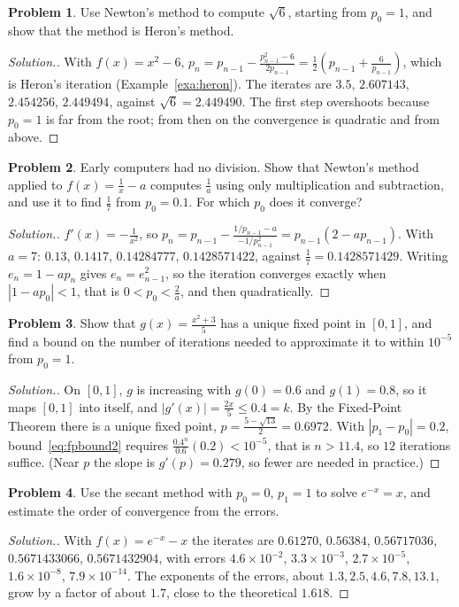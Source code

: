 \documentclass[11pt,a4paper]{article}
\numberwithin{equation}{section}
\theoremstyle{definition}
\newtheorem{problemx}{Problem}[subsection]
\newenvironment{problem}{\begin{problemx}}{\end{problemx}}
\newenvironment{solution}
  {\renewcommand{\qedsymbol}{}\begin{proof}[\textit{Solution}.]}
  {\end{proof}}
\begin{document}
\begin{problem}
Use Newton's method to compute $\sqrt6$, starting from $p_0 = 1$, and show that the method is Heron's method.
\end{problem}
\begin{solution}
With $f(x) = x^2-6$, $p_n = p_{n-1}-\frac{p_{n-1}^2-6}{2p_{n-1}} = \frac12\left(p_{n-1}+\frac{6}{p_{n-1}}\right)$, which is Heron's iteration
(Example~\ref{exa:heron}). The iterates are $3.5$, $2.607143$, $2.454256$, $2.449494$, against $\sqrt6 = 2.449490$. The first step overshoots
because $p_0 = 1$ is far from the root; from then on the convergence is quadratic and from above.
\end{solution}

\begin{problem}
Early computers had no division. Show that Newton's method applied to $f(x) = \frac1x-a$ computes $\frac1a$ using only multiplication and
subtraction, and use it to find $\frac17$ from $p_0 = 0.1$. For which $p_0$ does it converge?
\end{problem}
\begin{solution}
$f'(x) = -\frac{1}{x^2}$, so $p_n = p_{n-1}-\frac{1/p_{n-1}-a}{-1/p_{n-1}^2} = p_{n-1}(2-ap_{n-1})$. With $a = 7$: $0.13$, $0.1417$, $0.14284777$,
$0.1428571422$, against $\frac17 = 0.1428571429$. Writing $e_n = 1-ap_n$ gives $e_n = e_{n-1}^2$, so the iteration converges exactly when
$|1-ap_0|<1$, that is $0<p_0<\frac2a$, and then quadratically.
\end{solution}

\begin{problem}
Show that $g(x) = \frac{x^2+3}{5}$ has a unique fixed point in $[0,1]$, and find a bound on the number of iterations needed to approximate it
to within $10^{-5}$ from $p_0 = 1$.
\end{problem}
\begin{solution}
On $[0,1]$, $g$ is increasing with $g(0) = 0.6$ and $g(1) = 0.8$, so it maps $[0,1]$ into itself, and $|g'(x)| = \frac{2x}{5}\leq0.4 = k$.
By the Fixed-Point Theorem there is a unique fixed point, $p = \frac{5-\sqrt{13}}{2} = 0.6972$. With $|p_1-p_0| = 0.2$, bound~\eqref{eq:fpbound2}
requires $\frac{0.4^n}{0.6}(0.2)<10^{-5}$, that is $n>11.4$, so $12$ iterations suffice. (Near $p$ the slope is $g'(p) = 0.279$, so fewer are
needed in practice.)
\end{solution}

\begin{problem}
Use the secant method with $p_0 = 0$, $p_1 = 1$ to solve $e^{-x} = x$, and estimate the order of convergence from the errors.
\end{problem}
\begin{solution}
With $f(x) = e^{-x}-x$ the iterates are $0.61270$, $0.56384$, $0.56717036$, $0.5671433066$, $0.5671432904$, with errors $4.6\times10^{-2}$,
$3.3\times10^{-3}$, $2.7\times10^{-5}$, $1.6\times10^{-8}$, $7.9\times10^{-14}$. The exponents of the errors, about $1.3, 2.5, 4.6, 7.8,
13.1$, grow by a factor of about $1.7$, close to the theoretical $1.618$.
\end{solution}
\end{document}
